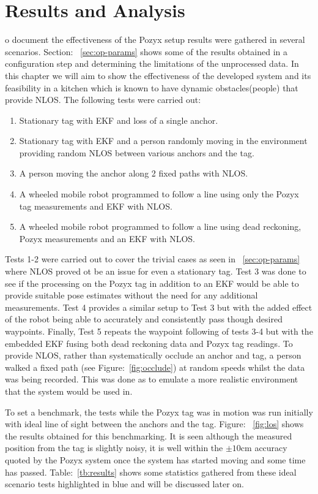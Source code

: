 \chapter{Results and Analysis}\label{ch:results-and-analysis}
o document the effectiveness of the Pozyx setup results were gathered in several scenarios.
Section: ~\ref{sec:op-params} shows some of the results obtained in a configuration step and determining the limitations of the unprocessed data.
In this chapter we will aim to show the effectiveness of the developed system and its feasibility in a kitchen which is known to have dynamic obstacles(people) that provide NLOS.
The following tests were carried out:
\begin{enumerate}
    \item Stationary tag with EKF and loss of a single anchor.
    \item Stationary tag with EKF and a person randomly moving in the environment providing random NLOS between various anchors and the tag.
    \item A person moving the anchor along 2 fixed paths with NLOS.
    \item A wheeled mobile robot programmed to follow a line using only the Pozyx tag measurements and EKF with NLOS.
    \item A wheeled mobile robot programmed to follow a line using dead reckoning, Pozyx measurements and an EKF with NLOS.
\end{enumerate}


Tests 1-2 were carried out to cover the trivial cases as seen in ~\ref{sec:op-params} where NLOS proved ot be an issue for even a stationary tag.
Test 3 was done to see if the processing on the Pozyx tag in addition to an EKF would be able to provide suitable pose estimates without the need for any additional measurements.
Test 4 provides a similar setup to Test 3 but with the added effect of the robot being able to accurately and consistently pass though desired waypoints.
Finally, Test 5 repeats the waypoint following of tests 3-4 but with the embedded EKF fusing both dead reckoning data and Pozyx tag readings.
To provide NLOS, rather than systematically occlude an anchor and tag, a person walked a fixed path (see Figure:~\ref{fig:occlude}) at random speeds whilst the data was being recorded.
This was done as to emulate a more realistic environment that the system would be used in.

To set a benchmark, the tests while the Pozyx tag was in motion was run initially with ideal line of sight between the anchors and the tag.
Figure: ~\ref{fig:los} shows the results obtained for this benchmarking.
It is seen although the measured position from the tag is slightly noisy, it is well within the $\pm10$cm accuracy quoted by the Pozyx system once the system has started moving and some time has passed.
Table:~\ref{tb:results} shows some statistics gathered from these ideal scenario tests highlighted in blue and will be discussed later on.

